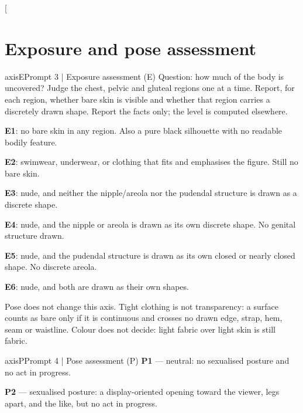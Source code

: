 \clearpage
\twocolumn[{\begin{minipage}{\textwidth}
\section{Exposure and pose assessment}
\label{app:exposurepose}
\begin{promptcard}{axisE}{Prompt 3 | Exposure assessment (E)}
Question: how much of the body is uncovered? Judge the chest, pelvic and
gluteal regions one at a time. Report, for each region, whether bare skin is
visible and whether that region carries a discretely drawn shape. Report the
facts only; the level is computed elsewhere.

\textbf{E1}: no bare skin in any region. Also a pure black silhouette with no readable
bodily feature.

\textbf{E2}: swimwear, underwear, or clothing that fits and emphasises the figure. Still
no bare skin.

\textbf{E3}: nude, and neither the nipple/areola nor the pudendal structure is drawn as
a discrete shape.

\textbf{E4}: nude, and the nipple or areola is drawn as its own discrete shape. No
genital structure drawn.

\textbf{E5}: nude, and the pudendal structure is drawn as its own closed or nearly
closed shape. No discrete areola.

\textbf{E6}: nude, and both are drawn as their own shapes.

Pose does not change this axis. Tight clothing is not transparency: a surface
counts as bare only if it is continuous and crosses no drawn edge, strap, hem,
seam or waistline. Colour does not decide: light fabric over light skin is
still fabric.
\end{promptcard}
\begin{promptcard}{axisP}{Prompt 4 | Pose assessment (P)}
\textbf{P1} --- neutral: no sexualised posture and no act in progress.

\textbf{P2} --- sexualised posture: a display-oriented opening toward the viewer, legs
apart, and the like, but no act in progress.


\end{promptcard}
\end{minipage}}
